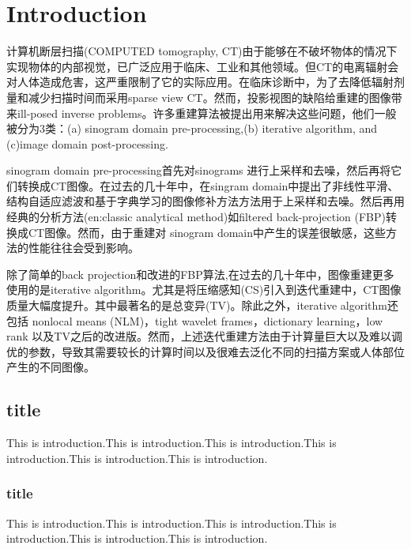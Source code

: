 \section{Introduction}
计算机断层扫描(COMPUTED tomography, CT)由于能够在不破坏物体的情况下实现物体的内部视觉，已广泛应用于临床、工业和其他领域\cite{2018Deep}。但CT的电离辐射会对人体造成危害\cite{2012Hall}，这严重限制了它的实际应用。在临床诊断中，为了去降低辐射剂量和减少扫描时间而采用sparse view CT。然而，投影视图的缺陷给重建的图像带来ill-posed inverse problems\cite{1989Incomplete}。许多重建算法被提出用来解决这些问题，他们一般被分为3类：(a) sinogram domain pre-processing,(b) iterative algorithm, and (c)image domain post-processing.\par
sinogram domain pre-processing首先对sinograms 进行上采样和去噪，然后再将它们转换成CT图像。在过去的几十年中，在singram domain中提出了非线性平滑\cite{2004Nonlinear}、结构自适应滤波\cite{2012Ray}和基于字典学习的图像修补方法\cite{2014Dictionary}方法用于上采样和去噪。然后再用经典的分析方法(en:classic analytical method)如filtered back-projection (FBP)\cite{kak2001principles}转换成CT图像。然而，由于重建对 sinogram domain中产生的误差很敏感，这些方法的性能往往会受到影响。\par
除了简单的back projection和改进的FBP算法,在过去的几十年中，图像重建更多使用的是iterative algorithm。尤其是将压缩感知(CS)\cite{2006Robust}\cite{2006Donoho}引入到迭代重建中，CT图像质量大幅度提升。其中最著名的是总变异(TV)\cite{2008Image}。除此之外，iterative algorithm还包括 nonlocal means (NLM)\cite{2009Bayesian}，tight wavelet frames\cite{2011Multi}，dictionary learning\cite{2012Low,2019Convolutional}，low rank\cite{2014Cine} 以及TV之后的改进版\cite{2014Sparse,2016Statistical,2013Few}。然而，上述迭代重建方法由于计算量巨大以及难以调优的参数，导致其需要较长的计算时间以及很难去泛化不同的扫描方案或人体部位产生的不同图像。\par

\subsection{title}
This is introduction.This is introduction.This is introduction.This is introduction.This is introduction.This is introduction.\cite{redcnn}
\subsubsection{title}
This is introduction.This is introduction.This is introduction.This is introduction.This is introduction.This is introduction.